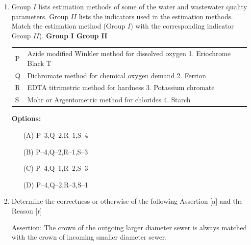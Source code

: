 \documentclass[journal]{IEEEtran}
\begin{document}
\begin{enumerate}
\begin{multicols}{2}

\begin{enumerate}
\item $8.6$ 
\item $8.4$
\item $5.6$ 
\item $5.4$ 
\end{enumerate}     
\end{multicols}

\item Group $I$ lists estimation methods of some of the water and wastewater quality parameters. Group $II$ lists the indicators used in the estimation methods. Match the estimation method (Group $I$) with the corresponding indicator Group $II$). \textbf{}
\textbf{Group I \hfill Group II}

\begin{tabular}{ll}
P & Azide modified Winkler method for dissolved oxygen \hfill 1. Eriochrome Black T \\
Q & Dichromate method for chemical oxygen demand \hfill 2. Ferrion \\
R & EDTA titrimetric method for hardness \hfill 3. Potassium chromate \\
S & Mohr or Argentometric method for chlorides \hfill 4. Starch \\
\end{tabular}

\vspace{0.5cm}

\textbf{Options:}
\begin{itemize}
  \item[(A)] P--3,\quad Q--2,\quad R--1,\quad S--4
  \item[(B)] P--4,\quad Q--2,\quad R--1,\quad S--3
  \item[(C)] P--4,\quad Q--1,\quad R--2,\quad S--3
  \item[(D)] P--4,\quad Q--2,\quad R--3,\quad S--1
\end{itemize}


\item Determine the correctness or otherwise of the following Assertion [a] and the Reason [r]
\vspace{0.1cm}

Assertion: The crown of the outgoing larger diameter sewer is always matched with the crown of
incoming smaller diameter sewer.
\vspace{0.1cm}


\end{enumerate}
\end{document}
